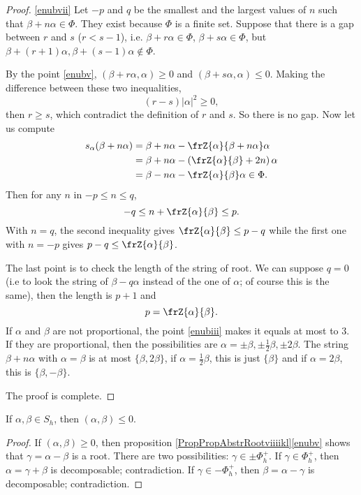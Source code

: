 \begin{proof}
\ref{enubvii} Let $-p$ and $q$ be the smallest and the largest values of $n$ such that $\beta+n\alpha \in\Phi$. They exist because $\Phi$ is a finite set. Suppose that there is a gap between $r$ and $s$ ($r<s-1$), i.e. $\beta+r\alpha\in\Phi$, $\beta+s\alpha\in\Phi$, but $\beta+(r+1)\alpha,\beta+(s-1)\alpha\notin\Phi$.

By the point \ref{enubv}, $(\beta+r\alpha,\alpha)\geq 0$ and $(\beta+s\alpha,\alpha)\leq 0$. Making the difference between these two inequalities,
\[
   (r-s)|\alpha|^2\geq 0,
\]
then $r\geq s$, which contradict the definition of $r$ and $s$. So there is no gap. Now let us compute
\begin{equation}
\begin{split}
   s_{\alpha}(\beta+n\alpha)&=\beta+n\alpha-\frZ{\alpha}{\beta+n\alpha}\alpha\\
                          &=\beta+n\alpha-\left(    \frZ{\alpha}{\beta}+2n    \right)\alpha\\
              &=\beta-n\alpha-\frZ{\alpha}{\beta}\alpha\in\Phi.
\end{split}
\end{equation}
Then for any $n$ in $-p\leq n\leq q$, 
\[
   -q\leq n+\frZ{\alpha}{\beta}\leq p.
\]
With $n=q$, the second inequality gives $\frZ{\alpha}{\beta}\leq p-q$ while the first one with $n=-p$ gives  $p-q\leq\frZ{\alpha}{\beta}$.

The last point is to check the length of the string of root. We can suppose $q=0$ (i.e to look the string of $\beta-q\alpha$ instead of the one of $\alpha$; of course this is the same), then the length is $p+1$ and
\[
   p=\frZ{\alpha}{\beta}.
\]
If $\alpha$ and $\beta$ are not proportional, the point \ref{enubiii} makes it equals at most to $3$. If they are proportional, then the possibilities are $\alpha=\pm\beta,\pm\frac{1}{2}\beta,\pm 2\beta$. The string $\beta+n\alpha$ with $\alpha=\beta$ is at most $\{\beta,2\beta\}$, if $\alpha=\frac{1}{2}\beta$, this is just $\{\beta\}$ and if $\alpha=2\beta$, this is $\{\beta,-\beta\}$.

The proof is complete.
\end{proof}

\begin{lemma}       \label{LemShabShablesz}
    If \( \alpha,\beta\in S_h\), then \( (\alpha,\beta)\leq 0\).
\end{lemma}

\begin{proof}
    If \( (\alpha,\beta)\geq 0\), then proposition \ref{PropPropAbstrRootviiiikl}\ref{enubv} shows that \( \gamma=\alpha-\beta\) is a root. There are two possibilities: \( \gamma\in\pm\Phi^+_h\). If \( \gamma\in\Phi^+_h\), then \( \alpha=\gamma+\beta\) is decomposable; contradiction. If \( \gamma\in -\Phi^+_h\), then \( \beta=\alpha-\gamma\) is decomposable; contradiction.
\end{proof}

